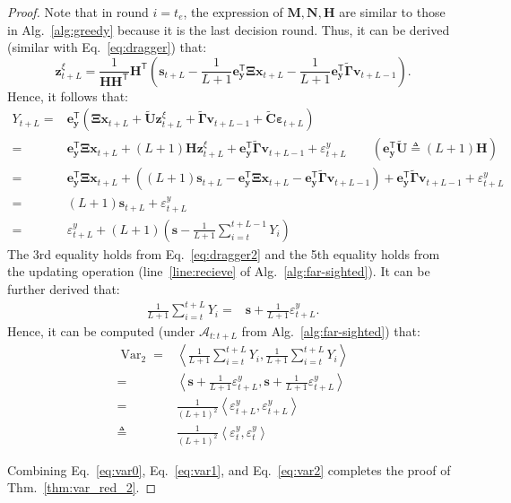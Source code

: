 \documentclass{article}
\theoremstyle{plain}
\theoremstyle{definition}
\theoremstyle{remark}
\def \Eq {Eq.}
\def \thm {Thm.}
\def \x {\mathbf{x}}
\def \sA {\mathcal{A}}
\def \N {\mathbf{N}}
\def \s {\mathbf{s}}
\def \U {\mathbf{U}}
\def \M {\mathbf{M}}
\def \H {\mathbf{H}}
\def \C {\mathbf{C}}
\def \e {\mathbf{e}}
\def \v {\mathbf{v}}
\def \y {\mathbf{y}}
\def \z {\mathbf{z}}
\begin{document}
\begin{proof}
Note that in round \(i=t_e\), the expression of \(\M,\N,\H\) are similar to those in Alg.~\ref{alg:greedy} because it is the last decision round. 
Thus, it can be derived (similar with \Eq~\eqref{eq:dragger}) that:
\begin{equation}
  \label{eq:dragger2}
  \z_{t+L}^\xi = \frac{1}{\H\H^\mathsf{T}} \H^\mathsf{T} \left(\s_{t+L} - \frac{1}{L+1}\e_\y^\mathsf{T} \bm{\Xi}\x_{t+L}- \frac{1}{L+1}\e_\y^\mathsf{T} \tilde{\bm{\Gamma}}\v_{t+L-1}\right). 
\end{equation}
Hence, it follows that:
\[
\begin{aligned}
  Y_{t+L}  =& \e_\y^\mathsf{T}\left(\bm{\Xi}\x_{t+L} + \tilde{\U} \z_{t+L}^\xi +  \tilde{\bm{\Gamma}}\v_{t+L-1} + \tilde{\C} \bm{\varepsilon}_{t+L}\right)\\
  =& \e_\y^\mathsf{T} \bm{\Xi}\x_{t+L} + (L+1) \H \z_{t+L}^\xi + \e_\y^\mathsf{T} \tilde{\bm{\Gamma}}\v_{t+L-1} + \varepsilon^y_{t+L} \qquad (\e_\y^\mathsf{T}\tilde{\U} \triangleq(L+1)\H)\\
  =& \e_\y^\mathsf{T} \bm{\Xi}\x_{t+L} + \left((L+1)\s_{t+L} - \e_\y^\mathsf{T} \bm{\Xi}\x_{t+L}-\e_\y^\mathsf{T} \tilde{\bm{\Gamma}}\v_{t+L-1} \right) + \e_\y^\mathsf{T} \tilde{\bm{\Gamma}}\v_{t+L-1} + \varepsilon^y_{t+L} \\
  =& (L+1)\s_{t+L} + \varepsilon^y_{t+L}\\
  =& \varepsilon^y_{t+L} + (L+1)\left(\s - \frac{1}{L+1}\sum_{i=t}^{t+L-1} Y_{i}\right)
\end{aligned}
\]
The 3rd equality holds from \Eq~\eqref{eq:dragger2} and the 5th equality holds from the updating operation (line~\ref{line:recieve} of Alg.~\ref{alg:far-sighted}). 
It can be further derived that:
\[
\begin{aligned}
  \frac{1}{L+1}\sum_{i=t}^{t+L} Y_{i} =& \s + \frac{1}{L+1}\varepsilon^y_{t+L}. 
\end{aligned}
\]
Hence, it can be computed (under \(\sA_{t:t+L}\) from Alg.~\ref{alg:far-sighted}) that: 
\begin{equation}
  \label{eq:var2}
  \begin{aligned}
    \operatorname{Var}_2 =& \left\langle \frac{1}{L+1} \sum\limits_{i=t}^{t+L} Y_i, \frac{1}{L+1}  \sum\limits_{i=t}^{t+L} Y_i \right\rangle  \\
    =& \left\langle \s + \frac{1}{L+1}\varepsilon^y_{t+L}, \s + \frac{1}{L+1}\varepsilon^y_{t+L}\right\rangle\\
    = &\frac{1}{(L+1)^2} \left\langle \varepsilon^y_{t+L}, \varepsilon^y_{t+L}\right\rangle\\
    \triangleq &\frac{1}{(L+1)^2} \left\langle \varepsilon^y_t, \varepsilon^y_t\right\rangle
  \end{aligned}
\end{equation}

Combining \Eq~\eqref{eq:var0}, \Eq~\eqref{eq:var1}, and \Eq~\eqref{eq:var2} completes the proof of \thm~\ref{thm:var_red_2}.


\end{proof}
\end{document}
